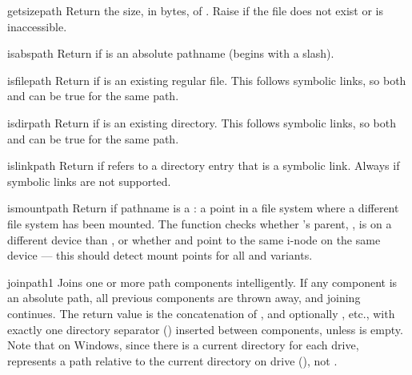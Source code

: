 \begin{funcdesc}{getsize}{path}
Return the size, in bytes, of .  Raise
 if the file does not exist or is inaccessible.
\end{funcdesc}

\begin{funcdesc}{isabs}{path}
Return  if  is an absolute pathname (begins with a
slash).
\end{funcdesc}

\begin{funcdesc}{isfile}{path}
Return  if  is an existing regular file.  This follows
symbolic links, so both  and 
can be true for the same path.
\end{funcdesc}

\begin{funcdesc}{isdir}{path}
Return  if  is an existing directory.  This follows
symbolic links, so both  and  can
be true for the same path.
\end{funcdesc}

\begin{funcdesc}{islink}{path}
Return  if  refers to a directory entry that is a
symbolic link.  Always  if symbolic links are not supported.
\end{funcdesc}

\begin{funcdesc}{ismount}{path}
Return  if pathname  is a : a point in
a file system where a different file system has been mounted.  The
function checks whether 's parent, , is
on a different device than , or whether 
and  point to the same i-node on the same device --- this
should detect mount points for all \UNIX{} and \POSIX{} variants.
\end{funcdesc}

\begin{funcdesc}{join}{path1}
Joins one or more path components intelligently.  If any component is
an absolute path, all previous components are thrown away, and joining
continues.  The return value is the concatenation of , and
optionally , etc., with exactly one directory separator
() inserted between components, unless  is
empty.  Note that on Windows, since there is a current directory for
each drive,  represents a path
relative to the current directory on drive  (), not
.
\end{funcdesc}

